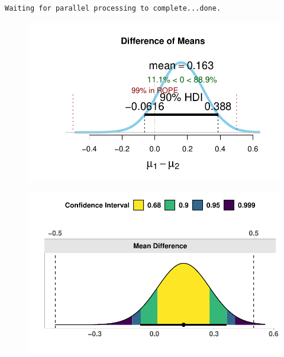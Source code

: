 \documentclass[
  letterpaper,
  DIV=11,
  numbers=noendperiod]{scrreprt}
\begin{document}
\begin{verbatim}
Waiting for parallel processing to complete...done.
\end{verbatim}

\begin{figure}

{\centering \includegraphics[width=1\textwidth,height=\textheight]{09-equivalencetest_files/figure-pdf/unnamed-chunk-6-1.pdf}

}

\end{figure}

\begin{figure}

{\centering \includegraphics[width=1\textwidth,height=\textheight]{09-equivalencetest_files/figure-pdf/unnamed-chunk-6-2.pdf}

}

\end{figure}
\end{document}
